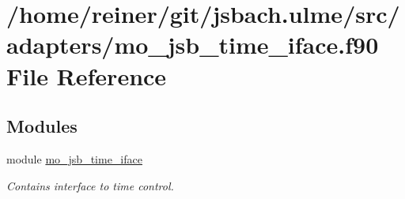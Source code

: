 \hypertarget{mo__jsb__time__iface_8f90}{}\section{/home/reiner/git/jsbach.ulme/src/adapters/mo\+\_\+jsb\+\_\+time\+\_\+iface.f90 File Reference}
\label{mo__jsb__time__iface_8f90}
\subsection*{Modules}
\begin{DoxyCompactItemize}
\item 
module \hyperlink{namespacemo__jsb__time__iface}{mo\+\_\+jsb\+\_\+time\+\_\+iface}
\begin{DoxyCompactList}\small\item\em Contains interface to time control. \end{DoxyCompactList}\end{DoxyCompactItemize}
